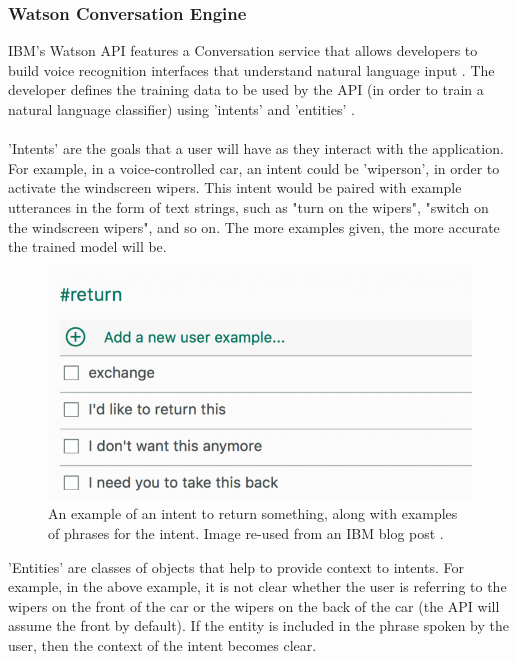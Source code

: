 \documentclass[12pt]{article}
\begin{document}
\subsubsection{Watson Conversation Engine}

IBM's Watson API features a Conversation service that allows developers to build voice recognition interfaces that understand natural language input \cite{RefWorks:27}. The developer defines the training data to be used by the API (in order to train a natural language classifier) using 'intents' and 'entities' \cite{RefWorks:31}.
\\
\\
'Intents' are the goals that a user will have as they interact with the application. For example, in a voice-controlled car, an intent could be 'wipers\textunderscore on', in order to activate the windscreen wipers. This intent would be paired with example utterances in the form of text strings, such as "turn on the wipers", "switch on the windscreen wipers", and so on. The more examples given, the more accurate the trained model will be.
\begin{center}
\begin{figure}[H]
  \includegraphics[width=\textwidth]{intent-return.png}
  \caption{An example of an intent to return something, along with examples of phrases for the intent. Image re-used from an IBM blog post \cite{RefWorks:34}.}
\end{figure}
\end{center}
'Entities' are classes of objects that help to provide context to intents. For example, in the above example, it is not clear whether the user is referring to the wipers on the front of the car or the wipers on the back of the car (the API will assume the front by default). If the entity is included in the phrase spoken by the user, then the context of the intent becomes clear.
\end{document}
